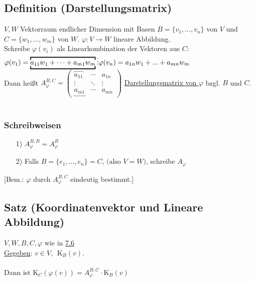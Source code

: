 \documentclass[a4paper, 12pt,titlepage, pdf, headsepline]{scrartcl}
\newcommand{\uline}[1]{\underline{#1}}
\renewcommand{\>}{\rightarrow}
\renewcommand{\*}{\cdot}
\renewcommand{\phi}{\varphi}
\begin{document}
		      				\subsection{Definition (Darstellungsmatrix)}
		      				\label{7.6}
		      				$V,W$ Vektorraum endlicher Dimension mit Basen $B = \{v_1,...,v_n\}$ von $V$ und $C = \{w_1,...,w_m\}$ von $W$. $\phi: V \rightarrow W$ lineare Abbildung.\\
		      				Schreibe $\phi(v_i)$ als Linearkombination der Vektoren aus $C$:\\
		      				$\phi(v_1) = \overbracket{\underbracket{a_{11}w_1 + \cdots + a_{m1} w_m}} \\
		      				\vdots \\
		      				\phi(v_n) = a_{1n} w_1 + ... + a_{mn} w_m$\\
		      				Dann heißt $A_\phi^{B,C} = \begin{pmatrix}
		      				\overbracket{a_{11}} & \cdots & a_{1n} \\
		      				\vdots & \ddots & \vdots \\
		      				\underbracket{a_{m1}} & \cdots & a_{mn}
		      				\end{pmatrix}$ \uline{Darstellungsmatrix von $\phi$} bzgl. $B$ und $C$.\\
		      				\\
		      				\subsubsection*{Schreibweisen}
		      				\begin{itemize}
		      					\item[1)] $A_\phi^{B,B} = A_\phi^B$
		      					\item[2)] Falls $B = \{e_1,...,e_n\} = C \textrm{, (also }V = W)$, schreibe $A_\phi$
		      				\end{itemize}
		      				$\Bigg[$Bem.: $\phi$ durch $A_\phi^{B,C}$ eindeutig bestimmt.$\Bigg]$
		      				\subsection{Satz (Koordinatenvektor und Lineare Abbildung)}
		      				\label{7.7}
		      				$V,W,B,C,\phi$ wie in \hyperref[7.6]{7.6}\\
		      				\uline{Gegeben}: $v \in V,~~ \text{K}_B(v)$.\\
		      				\\
		      				Dann ist K$_C(\phi(v)) = A_\phi^{B,C} \cdot \text{K}_B(v)$
\end{document}
